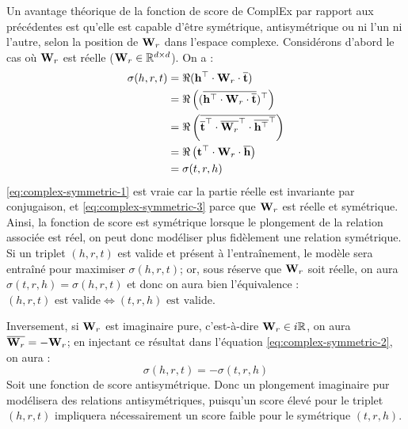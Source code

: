 Un avantage théorique de la fonction de score de ComplEx par rapport aux précédentes est qu'elle est capable d'être symétrique, antisymétrique ou ni l'un ni l'autre, selon la position de $\bf{W}_r$ dans l'espace complexe. Considérons d'abord le cas où $\bf{W}_r$ est réelle ($\bf{W}_r \in \R^{d \times d}$). On a :
\begin{align}
    \sigma(h, r, t) &= \Re(\bf{h^\top \cdot W}_r \cdot \compconj{\bf{t}}) \\
    &= \Re\left((\compconj{\bf{h^\top \cdot W}_r \cdot \compconj{\bf{t}}})^\top\right) \label{eq:complex-symmetric-1} \\
    &= \Re\left( \compconj{\compconj{\bf{t}}^\top \cdot \compconj{\bf{W}_r}^\top \cdot 
    \compconj{\bf{h^\top}}^\top}\right) \label{eq:complex-symmetric-2} \\
    &= \Re\left(\bf{t}^\top \cdot \bf{W}_r \cdot \compconj{\bf{h}}\right) \label{eq:complex-symmetric-3} \\
    &= \sigma(t, r, h)
\end{align}
\ref{eq:complex-symmetric-1} est vraie car la partie réelle est invariante par conjugaison, et \ref{eq:complex-symmetric-3} parce que $\bf{W}_r$ est réelle et symétrique. Ainsi, la fonction de score est symétrique lorsque le plongement de la relation associée est réel, on peut donc modéliser plus fidèlement une relation symétrique. Si un triplet $(h, r, t)$ est valide et présent à l'entraînement, le modèle sera entraîné pour maximiser $\sigma(h, r, t)$; or, sous réserve que $\bf{W}_r$ soit réelle, on aura $\sigma(t, r, h) = \sigma(h, r, t)$ et donc on aura bien l'équivalence : $(h, r, t) \text{ est valide} \iff (t, r, h) \text{ est valide}$.

Inversement, si $\bf{W}_r$ est imaginaire pure, c'est-à-dire $\bf{W}_r \in i\R$, on aura $\compconj{\bf{W}_r} = - \bf{W}_r$; en injectant ce résultat dans l'équation \ref{eq:complex-symmetric-2}, on aura :
\begin{equation}
    \sigma(h, r, t) = - \sigma(t, r, h)
\end{equation}
Soit une fonction de score antisymétrique. Donc un plongement imaginaire pur modélisera des relations antisymétriques, puisqu'un score élevé pour le triplet $(h, r, t)$ impliquera nécessairement un score faible pour le symétrique $(t, r, h)$.

